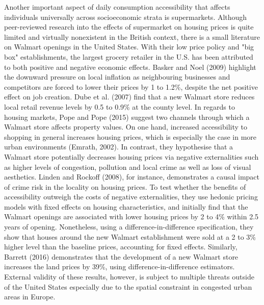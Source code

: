 \documentclass{article}
\begin{document}
Another important aspect of daily consumption accessibility that affects individuals universally across socioeconomic strata is supermarkets. Although peer-reviewed research into the effects of supermarket on housing prices is quite limited and virtually nonexistent in the British context, there is a small literature on Walmart openings in the United States. With their low price policy and "big box" establishments, the largest grocery retailer in the U.S. has been attributed to both positive and negative economic effects. 
Basker and Noel (2009) highlight the downward pressure on local inflation as neighbouring businesses and competitors are forced to lower their prices by 1 to 1.2\%, despite the net positive effect on job creation. Dube et al. (2007) find that a new Walmart store reduces local retail revenue levels by 0.5 to 0.9\% at the county level. In regards to housing markets, Pope and Pope (2015) suggest two channels through which a Walmart store affects property values. On one hand, increased accessibility to shopping in general increases housing prices, which is especially the case in more urban environments (Emrath, 2002). In contrast, they hypothesise that a Walmart store potentially decreases housing prices via negative externalities such as higher levels of congestion, pollution and local crime as well as loss of visual aesthetics. Linden and Rockoff (2008), for instance, demonstrates a causal impact of crime risk in the locality on housing prices. To test whether the benefits of accessibility outweigh the costs of negative externalities, they use hedonic pricing models with fixed effects on housing characteristics, and initially find that the Walmart openings are associated with lower housing prices by 2 to 4\% within 2.5 years of opening. Nonetheless, using a difference-in-difference specification, they show that houses around the new Walmart establishment were sold at a 2 to 3\% higher level than the baseline prices, accounting for fixed effects. Similarly, Barrett (2016) demonstrates that the development of a new Walmart store increases the land prices by 39\%, using difference-in-difference estimators. External validity of these results, however, is subject to multiple threats outside of the United States especially due to the spatial constraint in congested urban areas in Europe.
\end{document}

